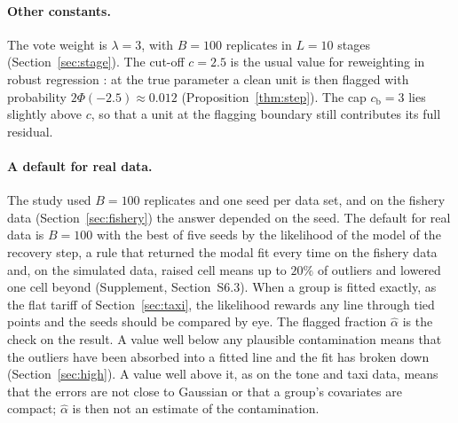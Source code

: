 \paragraph{Other constants.} The vote weight is $\lambda=3$, with $B=100$ replicates in
$L=10$ stages (Section~\ref{sec:stage}). The cut-off $c=2.5$ is the usual value for
reweighting in robust regression \citep{rousseeuw1987robust}: at the true parameter a clean
unit is then flagged with probability $2\Phi(-2.5)\approx0.012$ (Proposition~\ref{thm:step}).
The cap $c_{\mathrm b}=3$ lies slightly above $c$, so that a unit at the flagging boundary
still contributes its full residual.

\paragraph{A default for real data.} The study used $B=100$ replicates and one seed per
data set, and on the fishery data (Section~\ref{sec:fishery}) the answer depended on the seed.
The default for real data is $B=100$ with the best of five seeds by the likelihood of the model
of the recovery step, a rule that returned the modal fit every time on the fishery data and, on
the simulated data, raised cell means up to $20\%$ of outliers and lowered one cell beyond
(Supplement, Section~S6.3). When a group is fitted exactly, as the flat tariff of
Section~\ref{sec:taxi}, the likelihood rewards any line through tied points and the seeds
should be compared by eye. The flagged fraction $\hat\alpha$ is the check on the result. A
value well below any plausible contamination means that the outliers have been absorbed into a
fitted line and the fit has broken down (Section~\ref{sec:high}). A value well above it,
as on the tone and taxi data, means that the errors are not close to Gaussian or that a group's
covariates are compact; $\hat\alpha$ is then not an estimate of the contamination.
